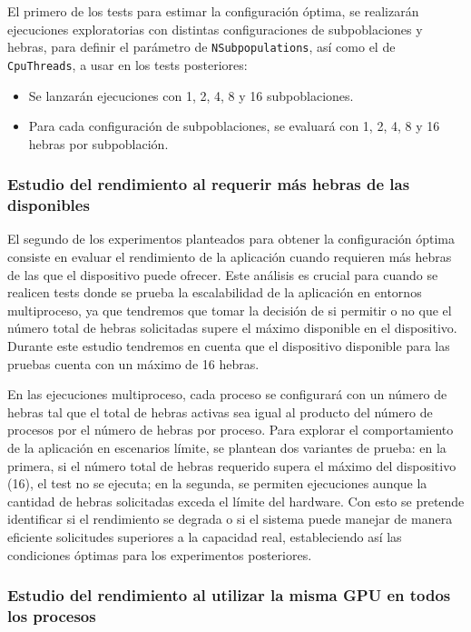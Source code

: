 El primero de los tests para estimar la configuración óptima, se realizarán ejecuciones exploratorias con distintas configuraciones de subpoblaciones y hebras, para definir el parámetro de \texttt{NSubpopulations}, así como el de \texttt{CpuThreads}, a usar en los tests posteriores:

\begin{itemize}
    \item Se lanzarán ejecuciones con 1, 2, 4, 8 y 16 subpoblaciones.
    \item Para cada configuración de subpoblaciones, se evaluará con 1, 2, 4, 8 y 16 hebras por subpoblación.
\end{itemize}

\subsubsection{Estudio del rendimiento al requerir más hebras de las disponibles}

El segundo de los experimentos planteados para obtener la configuración óptima consiste en evaluar el rendimiento de la aplicación cuando requieren más hebras de las que el dispositivo puede ofrecer. Este análisis es crucial para cuando se realicen tests donde se prueba la escalabilidad de la aplicación en entornos multiproceso, ya que tendremos que tomar la decisión de si permitir o no que el número total de hebras solicitadas supere el máximo disponible en el dispositivo. Durante este estudio tendremos en cuenta que el dispositivo disponible para las pruebas cuenta con un máximo de 16 hebras.

En las ejecuciones multiproceso, cada proceso se configurará con un número de hebras tal que el total de hebras activas sea igual al producto del número de procesos por el número de hebras por proceso. Para explorar el comportamiento de la aplicación en escenarios límite, se plantean dos variantes de prueba: en la primera, si el número total de hebras requerido supera el máximo del dispositivo (16), el test no se ejecuta; en la segunda, se permiten ejecuciones aunque la cantidad de hebras solicitadas exceda el límite del hardware. Con esto se pretende identificar si el rendimiento se degrada o si el sistema puede manejar de manera eficiente solicitudes superiores a la capacidad real, estableciendo así las condiciones óptimas para los experimentos posteriores.

\subsubsection{Estudio del rendimiento al utilizar la misma GPU en todos los procesos}

